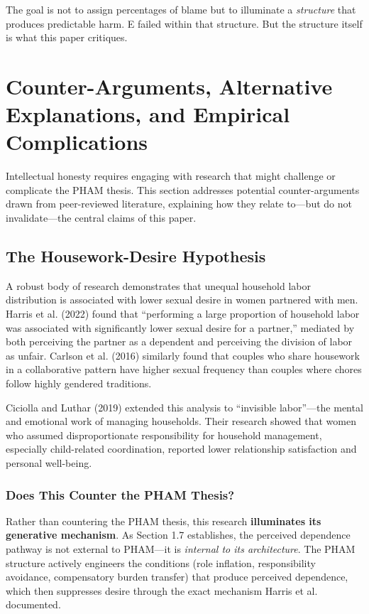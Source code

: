 \documentclass[12pt, letterpaper]{article}
\begin{document}
The goal is not to assign percentages of blame but to illuminate a \textit{structure} that produces predictable harm. E failed within that structure. But the structure itself is what this paper critiques.

\section{Counter-Arguments, Alternative Explanations, and Empirical Complications}

Intellectual honesty requires engaging with research that might challenge or complicate the PHAM thesis. This section addresses potential counter-arguments drawn from peer-reviewed literature, explaining how they relate to---but do not invalidate---the central claims of this paper.

\subsection{The Housework-Desire Hypothesis}

A robust body of research demonstrates that unequal household labor distribution is associated with lower sexual desire in women partnered with men. Harris et al. (2022) found that ``performing a large proportion of household labor was associated with significantly lower sexual desire for a partner,'' mediated by both perceiving the partner as a dependent and perceiving the division of labor as unfair. Carlson et al. (2016) similarly found that couples who share housework in a collaborative pattern have higher sexual frequency than couples where chores follow highly gendered traditions.

Ciciolla and Luthar (2019) extended this analysis to ``invisible labor''---the mental and emotional work of managing households. Their research showed that women who assumed disproportionate responsibility for household management, especially child-related coordination, reported lower relationship satisfaction and personal well-being.

\subsubsection{Does This Counter the PHAM Thesis?}

Rather than countering the PHAM thesis, this research \textbf{illuminates its generative mechanism}. As Section 1.7 establishes, the perceived dependence pathway is not external to PHAM---it is \textit{internal to its architecture}. The PHAM structure actively engineers the conditions (role inflation, responsibility avoidance, compensatory burden transfer) that produce perceived dependence, which then suppresses desire through the exact mechanism Harris et al. documented.
\end{document}
